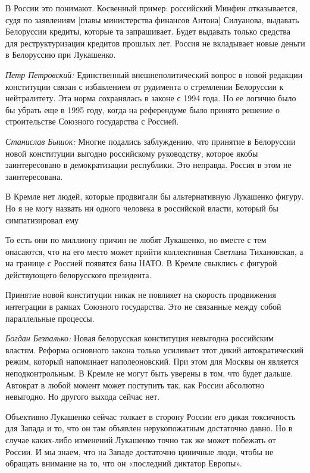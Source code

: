 В России это понимают. Косвенный пример: российский Минфин отказывается, судя по заявлениям [главы министерства финансов Антона] Силуанова, выдавать Белоруссии кредиты, которые та запрашивает. Будет выдавать только средства для реструктуризации кредитов прошлых лет. Россия не вкладывает новые деньги в Белоруссию при Лукашенко.

\textit{Петр Петровский:} Единственный внешнеполитический вопрос в новой редакции конституции связан с избавлением от рудимента о стремлении Белоруссии к нейтралитету. Эта норма сохранялась в законе с 1994 года. Но ее логично было бы убрать еще в 1995 году, когда на референдуме было принято решение о строительстве Союзного государства с Россией.

\textit{Станислав Бышок:} Многие подались заблуждению, что принятие в Белоруссии новой конституции выгодно российскому руководству, которое якобы заинтересовано в демократизации республики. Это неправда. Россия в этом не заинтересована.

\begin{fancyquotes}
    В Кремле нет людей, которые продвигали бы альтернативную Лукашенко фигуру. Но я не могу назвать ни одного человека в российской власти, который бы симпатизировал ему
\end{fancyquotes}

То есть они по миллиону причин не любят Лукашенко, но вместе с тем опасаются, что на его место может прийти коллективная Светлана Тихановская, а на границе с Россией появятся базы НАТО. В Кремле свыклись с фигурой действующего белорусского президента.

Принятие новой конституции никак не повлияет на скорость продвижения интеграции в рамках Союзного государства. Это не связанные между собой параллельные процессы.

\textit{Богдан Безпалько:} Новая белорусская конституция невыгодна российским властям. Реформа основного закона только усиливает этот дикий автократический режим, который напоминает наполеоновский. При этом для Москвы он является неподконтрольным. В Кремле не могут быть уверены в том, что будет дальше. Автократ в любой момент может поступить так, как России абсолютно невыгодно. Но другого выхода сейчас нет.

Объективно Лукашенко сейчас толкает в сторону России его дикая токсичность для Запада и то, что он там объявлен нерукопожатным достаточно давно. Но в случае каких-либо изменений Лукашенко точно так же может побежать от России. И мы знаем, что на Западе достаточно циничные люди, чтобы не обращать внимание на то, что он «последний диктатор Европы».


